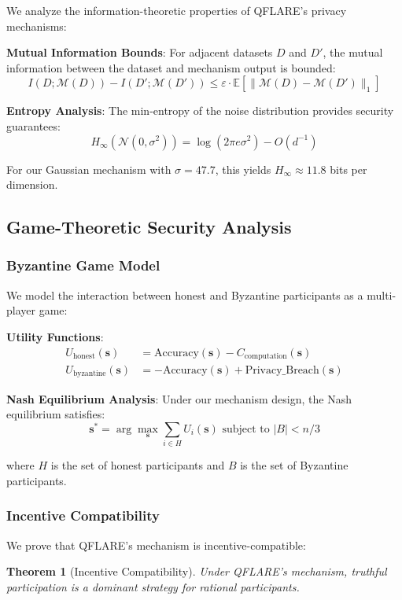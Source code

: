 \documentclass[journal,onecolumn,draftclsnofoot]{IEEEtran}
\newtheorem{theorem}{Theorem}
\begin{document}
We analyze the information-theoretic properties of QFLARE's privacy mechanisms:

\textbf{Mutual Information Bounds}:
For adjacent datasets $D$ and $D'$, the mutual information between the dataset and mechanism output is bounded:
$$I(D; \mathcal{M}(D)) - I(D'; \mathcal{M}(D')) \leq \varepsilon \cdot \mathbb{E}[\|\mathcal{M}(D) - \mathcal{M}(D')\|_1]$$

\textbf{Entropy Analysis}:
The min-entropy of the noise distribution provides security guarantees:
$$H_\infty(\mathcal{N}(0, \sigma^2)) = \log(2\pi e \sigma^2) - O(d^{-1})$$

For our Gaussian mechanism with $\sigma = 47.7$, this yields $H_\infty \approx 11.8$ bits per dimension.

\subsection{Game-Theoretic Security Analysis}

\subsubsection{Byzantine Game Model}

We model the interaction between honest and Byzantine participants as a multi-player game:

\textbf{Utility Functions}:
\begin{align}
U_{\text{honest}}(\mathbf{s}) &= \text{Accuracy}(\mathbf{s}) - C_{\text{computation}}(\mathbf{s}) \\
U_{\text{byzantine}}(\mathbf{s}) &= -\text{Accuracy}(\mathbf{s}) + \text{Privacy\_Breach}(\mathbf{s})
\end{align}

\textbf{Nash Equilibrium Analysis}:
Under our mechanism design, the Nash equilibrium satisfies:
$$\mathbf{s}^* = \arg\max_{\mathbf{s}} \sum_{i \in H} U_i(\mathbf{s}) \text{ subject to } |B| < n/3$$

where $H$ is the set of honest participants and $B$ is the set of Byzantine participants.

\subsubsection{Incentive Compatibility}

We prove that QFLARE's mechanism is incentive-compatible:

\begin{theorem}[Incentive Compatibility]
Under QFLARE's mechanism, truthful participation is a dominant strategy for rational participants.
\end{theorem}
\end{document}
